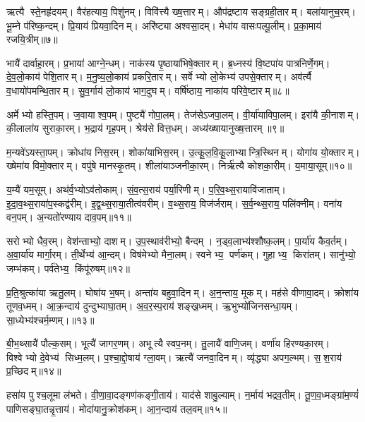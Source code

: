 ऋत्यै स्ते॒नहृ॑दयम्। वैर॑हत्याय॒ पिशु॑नम्। विवि॑त्त्यै ख्ष॒त्तारम्। औप॑द्रष्टाय सङ्ग्रही॒तारम्। बला॑यानुच॒रम्। भू॒म्ने प॑रिष्क॒न्दम्। प्रि॒याय॑ प्रियवा॒दिनम्। अरि॑ष्ट्या अश्वसा॒दम्। मेधा॑य वासःपल्पू॒लीम्। प्र॒का॒माय॑ रजयि॒त्रीम्॥७॥

भायै॑ दार्वाहा॒रम्। प्र॒भाया॑ आग्ने॒न्धम्। नाक॑स्य पृ॒ष्ठाया॑भिषे॒क्तारम्। ब्र॒ध्नस्य॑ वि॒ष्टपा॑य पात्रनिर्णे॒गम्। दे॒व॒लो॒काय॑ पेशि॒तारम्। म॒नु॒ष्य॒लो॒काय॑ प्रकरि॒तारम्। सर्वेभ्यो लो॒केभ्य॑ उपसे॒क्तारम्। अव॑र्त्यै व॒धायो॑पमन्थि॒तारम्। सु॒व॒र्गाय॑ लो॒काय॑ भाग॒दुघम्। वर्\mbox{}षि॑ष्ठाय॒ नाका॑य परिवे॒ष्टारम्॥८॥

अर्मेभ्यो हस्ति॒पम्। ज॒वायाश्व॒पम्। पुष्ट्यै॑ गोपा॒लम्। तेज॑सेऽजपा॒लम्। वी॒र्या॑याविपा॒लम्। इरा॑यै की॒नाशम्। की॒लाला॑य सुराका॒रम्। भ॒द्राय॑ गृह॒पम्। श्रेय॑से वित्त॒धम्। अध्य॑ख्षायानुख्ष॒त्तारम्॥९॥

म॒न्यवे॑ऽयस्ता॒पम्। क्रोधा॑य निस॒रम्। शोका॑याभिस॒रम्। उ॒त्कू॒ल॒वि॒कू॒लाभ्यान्त्रि॒स्थिनम्। योगा॑य यो॒क्तारम्। ख्षेमा॑य विमो॒क्तारम्। वपु॑षे मानस्कृ॒तम्। शीला॑याञ्जनीका॒रम्। निर्\mbox{}ऋ॑त्यै कोशका॒रीम्। य॒माया॒सूम्॥१०॥

य॒म्यै॑ यम॒सूम्। अथ॑र्व॒भ्योऽव॑तोकाम्। सं॒व॒त्स॒राय॑ पर्या॒रिणीम्। प॒रि॒व॒थ्स॒रायावि॑जाताम्। इ॒दा॒व॒थ्स॒राया॑प॒स्कद्व॑रीम्। इ॒द्व॒थ्स॒राया॒तीत्व॑वरीम्। व॒थ्स॒राय॒ विज॑र्जराम्। स॒र्व॒न्थ्स॒राय॒ पलि॑क्नीम्। वना॑य वन॒पम्। अ॒न्यतो॑रण्याय दाव॒पम्॥११॥

सरोभ्यो धैव॒रम्। वेश॑न्ताभ्यो॒ दाशम्। उ॒प॒स्थाव॑रीभ्यो॒ बैन्दम्। न॒ड्व॒लाभ्य॑श्शौष्क॒लम्। पा॒र्या॑य कैव॒र्तम्। अ॒वा॒र्या॑य मार्गा॒रम्। ती॒र्थेभ्य॑ आ॒न्दम्। विष॑मेभ्यो मैना॒लम्। स्वनेभ्य॒ पर्ण॑कम्। गुहाभ्य॒ किरा॑तम्। सानु॑भ्यो॒ जम्भ॑कम्। पर्व॑तेभ्य॒ किंपू॑रुषम्॥१२॥

प्र॒ति॒श्रुत्का॑या ऋतु॒लम्। घोषा॑य भ॒षम्। अन्ता॑य बहुवा॒दिनम्। अ॒न॒न्ताय॒ मूकम्। मह॑से वीणावा॒दम्। क्रोशा॑य तूणव॒ध्मम्। आ॒क्र॒न्दाय॑ दुन्दुभ्याघा॒तम्। अ॒व॒र॒स्प॒राय॑ शङ्ख॒ध्मम्। ऋ॒भुभ्यो॑जिनसन्धा॒यम्। सा॒ध्येभ्य॑श्चर्म॒म्णम्।॥१३॥

बी॒भ॒थ्सायै॑ पौल्क॒सम्। भूत्यै॑ जागर॒णम्। अभूत्यै स्वप॒नम्। तु॒लायै॑ वाणि॒जम्। वर्णा॑य हिरण्यका॒रम्। विश्वेभ्यो दे॒वेभ्य॑ सिध्म॒लम्। प॒श्चा॒द्दो॒षाय॑ ग्ला॒वम्। ऋत्यै॑ जनवा॒दिनम्। व्यृ॑द्ध्या अपग॒ल्भम्। स॒श॒राय॑ प्र॒च्छिदम्॥१४॥

हसा॑य पुश्च॒लूमा ल॑भते। वी॒णा॒वा॒दङ्गण॑कङ्गी॒ताय॑। याद॑से शाबु॒ल्याम्। न॒र्माय॑ भद्रव॒तीम्। तू॒ण॒व॒ध्मङ्ग्रा॑म॒ण्यं॑ पाणिसङ्घा॒तन्नृ॒त्ताय॑। मोदा॑यानु॒क्रोश॑कम्। आ॒न॒न्दाय॑ तल॒वम्॥१५॥

